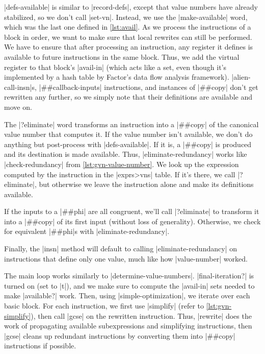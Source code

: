\factor|defs-available| is similar to \factor|record-defs|, except that value
numbers have already stabilized, so we don't call \factor|set-vn|.  Instead, we
use the \factor|make-available| word, which was the last one defined in
\vref{lst:avail}.  As we process the instructions of a block in order, we want
to make sure that local rewrites can still be performed.  We have to ensure
that after processing an instruction, any register it defines is available to
future instructions in the same block.  Thus, we add the virtual register to
that block's \factor|avail-in| (which acts like a set, even though it's
implemented by a hash table by Factor's data flow analysis framework).
\factor|alien-call-insn|s, \factor|##callback-inputs| instructions, and
instances of \factor|##copy| don't get rewritten any further, so we simply note
that their definitions are available and move on.

The \factor|?eliminate| word transforms an instruction into a \factor|##copy|
of the canonical value number that computes it.  If the value number isn't
available, we don't do anything but post-process with \factor|defs-available|.
If it is, a \factor|##copy| is produced and its destination is made available.
Thus, \factor|eliminate-redundancy| works like \factor|check-redundancy| from
\vref{lst:gvn-value-number}.  We look up the expression computed by the
instruction in the \factor|exprs>vns| table.  If it's there, we call
\factor|?eliminate|, but otherwise we leave the instruction alone and make its
definitions available.

If the inputs to a \factor|##phi| are all congruent, we'll call
\factor|?eliminate| to transform it into a \factor|##copy| of its first input
(without loss of generality).  Otherwise, we check for equivalent
\factor|##phi|s with \factor|eliminate-redundancy|.

Finally, the \factor|insn| method will default to calling
\factor|eliminate-redundancy| on instructions that define only one value, much
like how \factor|value-number| worked.

The main loop works similarly to \factor|determine-value-numbers|.
\factor|final-iteration?| is turned on (set to \factor|t|), and we make sure to
compute the \factor|avail-in| sets needed to make \factor|available?| work.
Then, using \factor|simple-optimization|, we iterate over each basic block.
For each instruction, we first use \factor|simplify| (refer to
\vref{lst:gvn-simplify}), then call \factor|gcse| on the rewritten instruction.
Thus, \factor|rewrite| does the work of propagating available subexpressions
and simplifying instructions, then \factor|gcse| cleans up redundant
instructions by converting them into \factor|##copy| instructions if possible.

